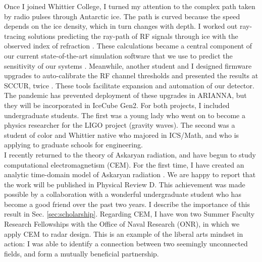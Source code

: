 \documentclass[../../main.tex]{subfiles}
\begin{document}
Once I joined Whittier College, I turned my attention to the complex path taken by radio pulses through Antarctic ice.  The path is curved because the speed depends on the ice density, which in turn changes with depth.  I worked out ray-tracing solutions predicting the ray-path of RF signals through ice with the observed index of refraction \cite{Barwick:2018497}.  These calculations became a central component of our current state-of-the-art simulation software that we use to predict the sensitivity of our systems \cite{10.1140/epjc/s10052-020-7612-8} \cite{10.1140/epjc/s10052-019-6971-5}.  Meanwhile, another student and I designed firmware upgrades to auto-calibrate the RF channel thresholds and presented the results at SCCUR, twice \cite{sccur1} \cite{sccur2}.  These tools facilitate expansion and automation of our detector.  The pandemic has prevented deployment of these upgrades in ARIANNA, but they will be incorporated in IceCube Gen2.  For both projects, I included undergraduate students.  The first was a young lady who went on to become a physics researcher for the LIGO project (gravity waves).  The second was a student of color and Whittier native who majored in ICS/Math, and who is applying to graduate schools for engineering.
\\
\vspace{0.25cm}
I recently returned to the theory of Askaryan radiation, and have begun to study computational electromagnetism (CEM).  For the first time, I have created an analytic time-domain model of Askaryan radiation \cite{time}.  We are happy to report that the work will be published in Physical Review D.  This achievement was made possible by a collaboration with a wonderful undergraduate student who has become a good friend over the past two years.  I describe the importance of this result in Sec. \ref{sec:scholarship}.  Regarding CEM, I have won two Summer Faculty Research Fellowships with the Office of Naval Research (ONR), in which we apply CEM to radar design.  This is an example of the liberal arts mindset in action: I was able to identify a connection between two seemingly unconnected fields, and form a mutually beneficial partnership.
\\
\vspace{0.25cm}
\end{document}

